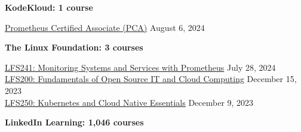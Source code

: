 \documentclass[10pt]{res} %
\begin{document}
\begin{resume}
\colorbox{kodekloud}{\color{white}\centerline{\bf KodeKloud: 1 course}}

\href{https://legacy.kodekloud.com/certificate-verification/2D16C11DCB74-2ED5A06EC2E1-2D16BAEADDF4}{\color{blue}Prometheus Certified Associate (PCA)} \hfill August 6, 2024

\colorbox{linux}{\color{white}\centerline{\bf The Linux Foundation: 3 courses}}

\href{https://www.credly.com/badges/41d02e47-ce1c-4cea-b306-4851de1aa014}{\color{blue}LFS241: Monitoring Systems and Services with Prometheus} \hfill July 28, 2024 \\
\href{https://www.credly.com/badges/7cc1b6ae-a8de-4c9b-b2fb-aabd89576bf3}{\color{blue}LFS200: Fundamentals of Open Source IT and Cloud Computing} \hfill December 15, 2023 \\
\href{https://www.credly.com/badges/f2d40024-9bca-4ca3-819e-83b6b0f55430}{\color{blue}LFS250: Kubernetes and Cloud Native Essentials} \hfill December 9, 2023

\colorbox{linkedin}{\color{white}\centerline{\bf LinkedIn Learning: 1,046 courses}}


\end{resume}
\end{document}
